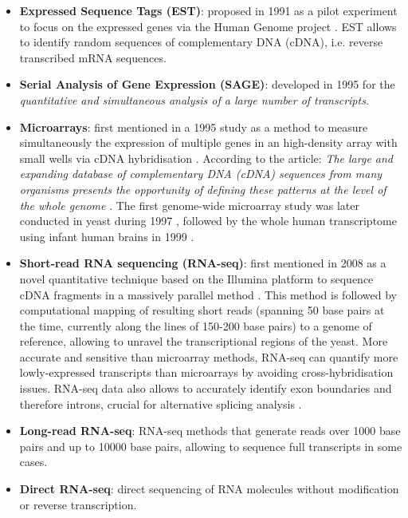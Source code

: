 \begin{itemize}
	\item \textbf{Expressed Sequence Tags (EST)}: proposed in 1991 as a pilot experiment to focus on the expressed genes via the Human Genome project \cite{adams:1991ua}. EST allows to identify random sequences of complementary DNA (cDNA), i.e. reverse transcribed mRNA sequences.%
	\item \textbf{Serial Analysis of Gene Expression (SAGE)}: developed in 1995 for the \emph{quantitative and simultaneous analysis of a large number of transcripts}. \cite{velculescu:1995vx}
	\item \textbf{Microarrays}: first mentioned in a 1995 study as a method to measure simultaneously the expression of multiple genes in an high-density array with small wells via cDNA hybridisation \cite{schena:1995tu}. According to the article: \emph{The large and expanding database of complementary DNA (cDNA) sequences from many organisms presents the opportunity of defining these patterns at the level of the whole genome} \cite{schena:1995tu}. The first genome-wide microarray study was later conducted in yeast during 1997 \cite{lashkari:1997wh}, followed by the whole human transcriptome using infant human brains in 1999 \cite{pietu:1999tl}.
	\item \textbf{Short-read RNA sequencing (RNA-seq)}: first mentioned in 2008 as a novel quantitative technique based on the Illumina platform to sequence cDNA fragments in a massively parallel method \cite{nagalakshmi:2008vs}. This method is followed by computational mapping of resulting short reads (spanning 50 base pairs at the time, currently along the lines of 150-200 base pairs) to a genome of reference, allowing to unravel the transcriptional regions of the yeast. More accurate and sensitive than microarray methods, RNA-seq can quantify more lowly-expressed transcripts than microarrays by avoiding cross-hybridisation issues. RNA-seq data also allows to accurately identify exon boundaries and therefore introns, crucial for alternative splicing analysis \cite{nagalakshmi:2008vs}.
	\item \textbf{Long-read RNA-seq}: RNA-seq methods that generate reads over 1000 base pairs and up to 10000 base pairs, allowing to sequence full transcripts in some cases.
	\item \textbf{Direct RNA-seq}: direct sequencing of RNA molecules without modification or reverse transcription.
\end{itemize}

